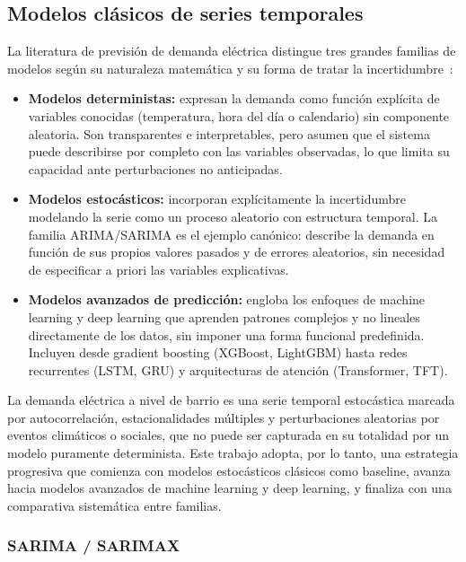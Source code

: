 \documentclass[12pt, a4paper]{article}
\begin{document}
\subsection{Modelos clásicos de series temporales}


La literatura de previsión de demanda eléctrica distingue tres grandes familias de modelos según su naturaleza matemática y su forma de tratar la incertidumbre~\cite{eke2025}:

\begin{itemize}
  \item \textbf{Modelos deterministas:} expresan la demanda como función explícita de variables conocidas (temperatura, hora del día o calendario) sin componente aleatoria. Son transparentes e interpretables, pero asumen que el sistema puede describirse por completo con las variables observadas, lo que limita su capacidad ante perturbaciones no anticipadas.
  \item \textbf{Modelos estocásticos:} incorporan explícitamente la incertidumbre modelando la serie como un proceso aleatorio con estructura temporal. La familia ARIMA/SARIMA es el ejemplo canónico: describe la demanda en función de sus propios valores pasados y de errores aleatorios, sin necesidad de especificar a priori las variables explicativas.
  \item \textbf{Modelos avanzados de predicción:} engloba los enfoques de machine learning y deep learning que aprenden patrones complejos y no lineales directamente de los datos, sin imponer una forma funcional predefinida. Incluyen desde gradient boosting (XGBoost, LightGBM) hasta redes recurrentes (LSTM, GRU) y arquitecturas de atención (Transformer, TFT).
\end{itemize}


La demanda eléctrica a nivel de barrio es una serie temporal estocástica marcada por autocorrelación, estacionalidades múltiples y perturbaciones aleatorias por eventos climáticos o sociales, que no puede ser capturada en su totalidad por un modelo puramente determinista. Este trabajo adopta, por lo tanto, una estrategia progresiva que comienza con modelos estocásticos clásicos como baseline, avanza hacia modelos avanzados de machine learning y deep learning, y finaliza con una comparativa sistemática entre familias.

\subsubsection{SARIMA / SARIMAX}
\end{document}
